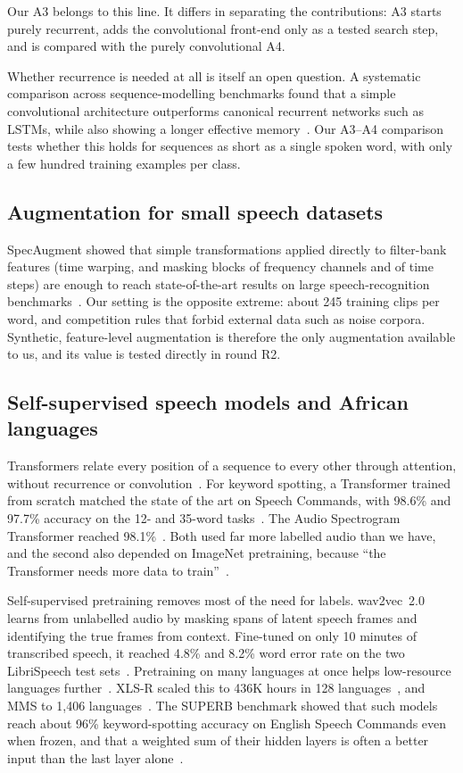 Our A3 belongs to this line. It differs in separating the contributions: A3 starts purely recurrent, adds the
convolutional front-end only as a tested search step, and is compared with the purely convolutional A4.

Whether recurrence is needed at all is itself an open question. A systematic comparison across sequence-modelling
benchmarks found that a simple convolutional architecture outperforms canonical recurrent networks such as LSTMs,
while also showing a longer effective memory~\cite{bai2018empirical}. Our A3--A4 comparison tests whether this
holds for sequences as short as a single spoken word, with only a few hundred training examples per class.

\subsection{Augmentation for small speech datasets}
SpecAugment showed that simple transformations applied directly to filter-bank features (time warping, and
masking blocks of frequency channels and of time steps) are enough to reach state-of-the-art results on large
speech-recognition benchmarks~\cite{park2019specaugment}. Our setting is the opposite extreme: about 245 training
clips per word, and competition rules that forbid external data such as noise corpora. Synthetic, feature-level
augmentation is therefore the only augmentation available to us, and its value is tested directly in round R2.

\subsection{Self-supervised speech models and African languages}
Transformers relate every position of a sequence to every other through attention, without recurrence or
convolution~\cite{vaswani2017attention}. For keyword spotting, a Transformer trained from scratch matched the state
of the art on Speech Commands, with 98.6\% and 97.7\% accuracy on the 12- and 35-word tasks~\cite{berg2021keyword}.
The Audio Spectrogram Transformer reached 98.1\%~\cite{gong2021ast}. Both used far more labelled audio than we
have, and the second also depended on ImageNet pretraining, because ``the Transformer needs more data to
train''~\cite{gong2021ast}.

Self-supervised pretraining removes most of the need for labels. wav2vec~2.0 learns from unlabelled audio by
masking spans of latent speech frames and identifying the true frames from context. Fine-tuned on only 10 minutes
of transcribed speech, it reached 4.8\% and 8.2\% word error rate on the two LibriSpeech test sets~\cite{baevski2020wav2vec}.
Pretraining on many languages at once helps low-resource languages further~\cite{conneau2021unsupervised}. XLS-R
scaled this to 436K hours in 128 languages~\cite{babu2022xlsr}, and MMS to 1{,}406
languages~\cite{pratap2024scaling}. The SUPERB benchmark showed that such models reach about 96\% keyword-spotting
accuracy on English Speech Commands even when frozen, and that a weighted sum of their hidden layers is often a
better input than the last layer alone~\cite{yang2021superb}.

